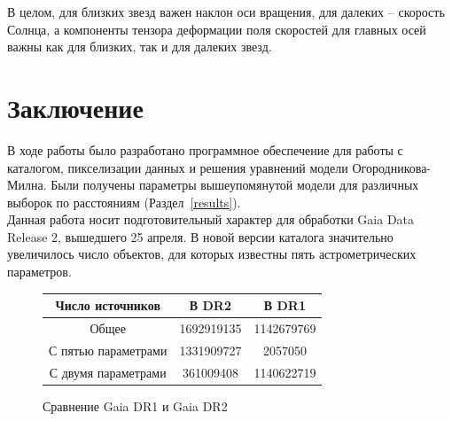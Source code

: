 \documentclass[14pt]{article} %
\begin{document}
В целом, для близких звезд важен наклон оси вращения, для далеких -- скорость Солнца, а компоненты тензора деформации поля скоростей для главных осей важны как для близких, так и для далеких звезд.
\section{Заключение}
В ходе работы было разработано программное обеспечение для работы с каталогом, пикселизации данных и решения уравнений модели Огородникова-Милна. Были получены параметры вышеупомянутой модели для различных выборок по расстояниям (Раздел~\ref{results}).\\

Данная работа носит подготовительный характер для обработки Gaia Data Release 2, вышедшего 25 апреля. В новой версии каталога значительно увеличилось число объектов, для которых известны пять астрометрических параметров.
\begin{figure}[!h]
\begin{tabular}{|c|c|c|}
\hline
Число источников&В DR2&В DR1\\
\hline
Общее&1692919135&1142679769\\
С пятью параметрами&1331909727&2057050\\
С двумя параметрами&361009408&1140622719\\
\hline
\end{tabular}
\caption*{Сравнение Gaia DR1 и Gaia DR2}
\end{figure}
\newpage
%
\def\apj{{ApJ}}                 %

\let\astap=\aap
\let\apjlett=\apjl
\let\apjsupp=\apjs
\let\applopt=\ao


\nocite{gaiasite}


\end{document}
